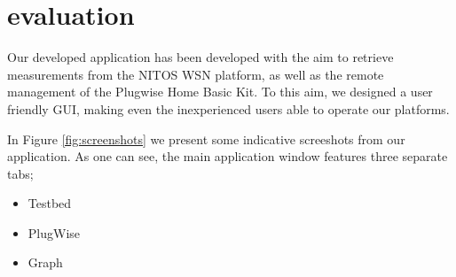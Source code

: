 \documentclass[conference]{IEEEtran}
\begin{document}
%





\section{evaluation}
Our developed application has been developed with the aim to retrieve measurements from the NITOS WSN platform, as well as the remote management of the Plugwise Home Basic Kit.
To this aim, we designed a user friendly GUI, making even the inexperienced users able to operate our platforms.

In Figure \ref{fig:screenshots} we present some indicative screeshots from our application. 
As one can see, the main application window features three separate tabs;
\begin{itemize}
\item 
Testbed
\item 
PlugWise
\item
Graph

\end{itemize}
\end{document}
